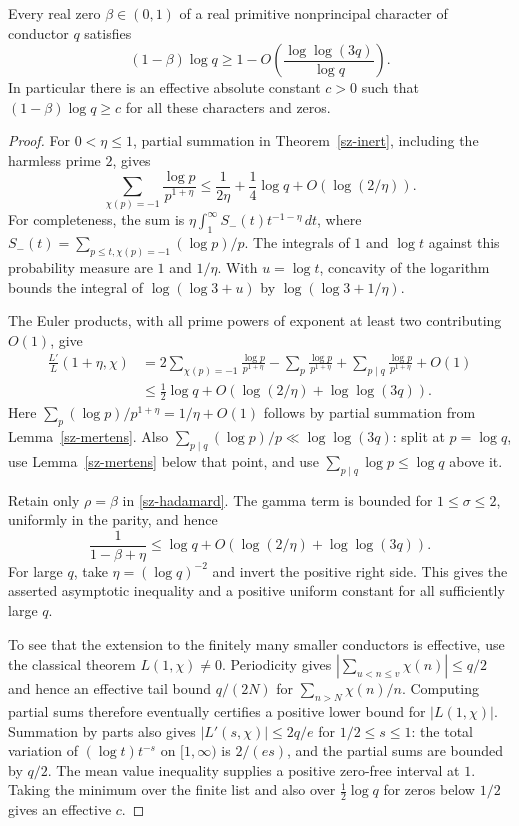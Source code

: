 \begin{corollary}\label{sz-zero-gap}
Every real zero $\beta\in(0,1)$ of a real primitive nonprincipal character
of conductor $q$ satisfies
\[
 (1-\beta)\log q\ge1-O\left(\frac{\log\log(3q)}{\log q}\right).
\]
In particular there is an effective absolute constant $c>0$ such that
$(1-\beta)\log q\ge c$ for all these characters and zeros.
\end{corollary}
\begin{proof}
For $0<\eta\le1$, partial summation in Theorem~\ref{sz-inert}, including
the harmless prime $2$, gives
\begin{equation}\label{sz-laplace}
 \sum_{\chi(p)=-1}\frac{\log p}{p^{1+\eta}}
 \le\frac1{2\eta}+\frac14\log q+O(\log(2/\eta)).
\end{equation}
For completeness, the sum is
$\eta\int_1^\infty S_-(t)t^{-1-\eta}\,dt$, where
$S_-(t)=\sum_{p\le t,\chi(p)=-1}(\log p)/p$.
The integrals of $1$ and $\log t$ against this probability measure are
$1$ and $1/\eta$. With $u=\log t$, concavity of the logarithm bounds
the integral of $\log(\log3+u)$ by $\log(\log3+1/\eta)$.

The Euler products, with all prime powers of exponent at least two
contributing $O(1)$, give
\begin{align*}
 \frac{L'}{L}(1+\eta,\chi)
 &=2\sum_{\chi(p)=-1}\frac{\log p}{p^{1+\eta}}
     -\sum_p\frac{\log p}{p^{1+\eta}}
     +\sum_{p\mid q}\frac{\log p}{p^{1+\eta}}+O(1)\\
 &\le\frac12\log q+O(\log(2/\eta)+\log\log(3q)).
\end{align*}
Here $\sum_p(\log p)/p^{1+\eta}=1/\eta+O(1)$ follows by partial
summation from Lemma~\ref{sz-mertens}. Also
$\sum_{p\mid q}(\log p)/p\ll\log\log(3q)$: split at $p=\log q$,
use Lemma~\ref{sz-mertens} below that point, and use
$\sum_{p\mid q}\log p\le\log q$ above it.

Retain only $\rho=\beta$ in \eqref{sz-hadamard}. The gamma term is
bounded for $1\le\sigma\le2$, uniformly in the parity, and hence
\[
 \frac1{1-\beta+\eta}
 \le\log q+O(\log(2/\eta)+\log\log(3q)).
\]
For large $q$, take $\eta=(\log q)^{-2}$ and invert the positive
right side. This gives the asserted asymptotic inequality and a positive
uniform constant for all sufficiently large $q$.

To see that the extension to the finitely many smaller conductors is
effective, use the classical theorem $L(1,\chi)\ne0$. Periodicity gives
$|\sum_{u<n\le v}\chi(n)|\le q/2$ and hence an effective tail bound
$q/(2N)$ for $\sum_{n>N}\chi(n)/n$. Computing partial sums therefore
eventually certifies a positive lower bound for $|L(1,\chi)|$.
Summation by parts also gives
$|L'(s,\chi)|\le 2q/e$ for $1/2\le s\le1$: the total variation of
$(\log t)t^{-s}$ on $[1,\infty)$ is $2/(es)$, and the partial sums
are bounded by $q/2$. The mean value inequality supplies a positive
zero-free interval at $1$. Taking the minimum over the finite list and
also over $\tfrac12\log q$ for zeros below $1/2$ gives an effective $c$.
\end{proof}

